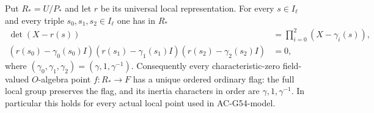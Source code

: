 \begin{theorem}
\label{AC-G57}
Put $R_*=U/P_*$ and let $r$ be its universal local
representation.  For every $s\in I_\ell$ and every
triple $s_0,s_1,s_2\in I_\ell$ one has in $R_*$
\[
\begin{split}
 \det(X-r(s))&=\prod_{i=0}^2(X-\gamma_i(s)),\\
 (r(s_0)-\gamma_0(s_0)I)
 (r(s_1)-\gamma_1(s_1)I)
 (r(s_2)-\gamma_2(s_2)I)&=0,
\end{split}                                                    \tag{G57.4}
\]
where $(\gamma_0,\gamma_1,\gamma_2)=(\gamma,1,\gamma^{-1})$.
Consequently every characteristic-zero field-valued
$O$-algebra point $f:R_*\to F$ has a unique ordered
ordinary flag: the full local group preserves the
flag, and its inertia characters in order are
$\gamma,1,\gamma^{-1}$.
In particular this holds for every actual local
point used in AC-G54-model.
\end{theorem}
